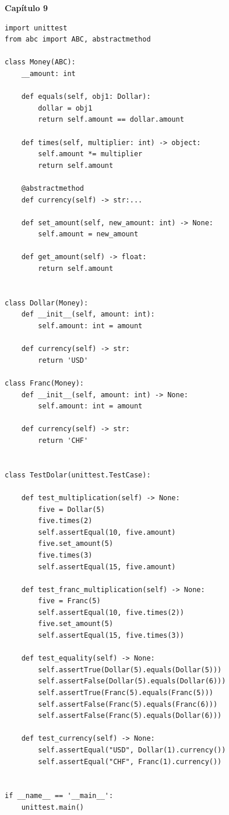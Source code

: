 \documentclass[a4paper,12pt]{article}
\newcommand{\capitulo}[1]{
    \vspace{1em}
    \noindent
    \colorbox{black!15}{
        \parbox{\dimexpr\linewidth-2\fboxsep}{
            \centering \Large \textbf{#1}
        }
    }
    \vspace{1em}
}
\begin{document}
\capitulo{Capítulo 9}
\begin{lstlisting}[style=pythonstyle]
import unittest
from abc import ABC, abstractmethod

class Money(ABC):
    __amount: int

    def equals(self, obj1: Dollar):
        dollar = obj1
        return self.amount == dollar.amount

    def times(self, multiplier: int) -> object:
        self.amount *= multiplier
        return self.amount

    @abstractmethod
    def currency(self) -> str:...

    def set_amount(self, new_amount: int) -> None:
        self.amount = new_amount

    def get_amount(self) -> float:
        return self.amount


class Dollar(Money):
    def __init__(self, amount: int):
        self.amount: int = amount

    def currency(self) -> str:
        return 'USD'

class Franc(Money):
    def __init__(self, amount: int) -> None:
        self.amount: int = amount

    def currency(self) -> str:
        return 'CHF'


class TestDolar(unittest.TestCase):

    def test_multiplication(self) -> None:
        five = Dollar(5)
        five.times(2) 
        self.assertEqual(10, five.amount)
        five.set_amount(5)
        five.times(3) 
        self.assertEqual(15, five.amount)

    def test_franc_multiplication(self) -> None:
        five = Franc(5)
        self.assertEqual(10, five.times(2))
        five.set_amount(5)
        self.assertEqual(15, five.times(3))

    def test_equality(self) -> None:
        self.assertTrue(Dollar(5).equals(Dollar(5)))
        self.assertFalse(Dollar(5).equals(Dollar(6)))
        self.assertTrue(Franc(5).equals(Franc(5)))
        self.assertFalse(Franc(5).equals(Franc(6)))
        self.assertFalse(Franc(5).equals(Dollar(6)))

    def test_currency(self) -> None:
        self.assertEqual("USD", Dollar(1).currency())
        self.assertEqual("CHF", Franc(1).currency())


if __name__ == '__main__':
    unittest.main()
\end{lstlisting}
\end{document}
